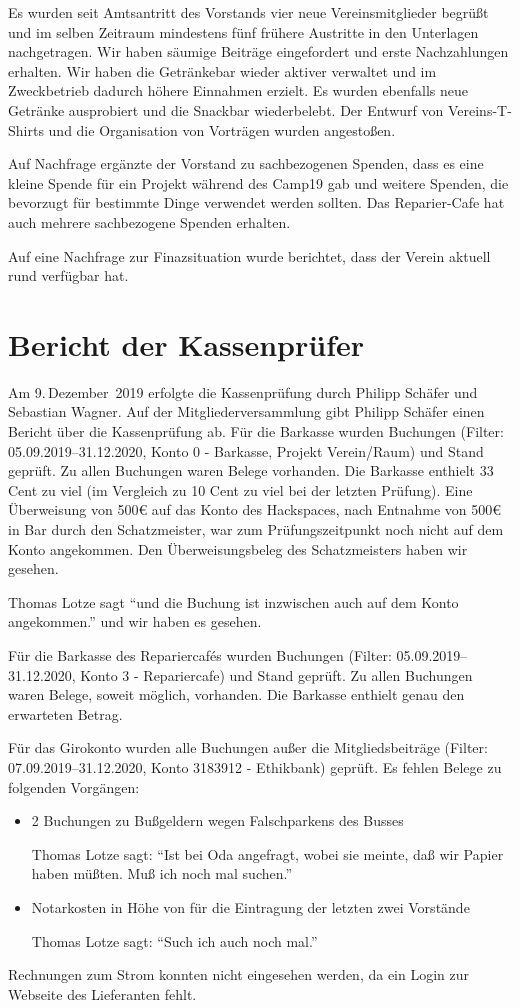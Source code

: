 \documentclass[DIV=calc,parksip=half*]{scrartcl}
\newcommand{\fiveop}{Philipp Schäfer}
\newcommand{\thomas}{Thomas Lotze}
\newcommand{\ckv}{Sebastian Wagner}
\begin{document}
Es wurden seit Amtsantritt des Vorstands vier neue Vereinsmitglieder begrüßt und im selben Zeitraum mindestens fünf frühere Austritte in den Unterlagen nachgetragen. Wir haben säumige Beiträge eingefordert und erste Nachzahlungen erhalten.
Wir haben die Getränkebar wieder aktiver verwaltet und im Zweckbetrieb dadurch höhere Einnahmen erzielt. Es wurden ebenfalls neue Getränke ausprobiert und die Snackbar wiederbelebt.
Der Entwurf von Vereins-T-Shirts und die Organisation von Vorträgen wurden angestoßen.

Auf Nachfrage ergänzte der Vorstand zu sachbezogenen Spenden, dass es eine kleine Spende für ein Projekt während des Camp19 gab und weitere Spenden, die bevorzugt für bestimmte Dinge verwendet werden sollten.
Das Reparier-Cafe hat auch mehrere sachbezogene Spenden erhalten.

Auf eine Nachfrage zur Finazsituation wurde berichtet, dass der Verein aktuell rund  verfügbar hat.
\section{Bericht der Kassenprüfer}
Am 9.\,Dezember~2019 erfolgte die Kassenprüfung durch \fiveop{} und  \ckv. Auf der
Mitgliederversammlung gibt \fiveop{} einen Bericht über die Kassenprüfung ab. Für die Barkasse wurden Buchungen (Filter: 05.09.2019--31.12.2020, Konto 0 - Barkasse, Projekt Verein/Raum) und Stand geprüft. Zu allen Buchungen waren Belege vorhanden. Die Barkasse enthielt 33 Cent zu viel (im Vergleich zu 10 Cent
zu viel bei der letzten Prüfung). Eine Überweisung von 500€ auf das Konto des Hackspaces, nach Entnahme von 500€ in Bar durch den Schatzmeister, war zum Prüfungszeitpunkt noch nicht auf dem Konto angekommen. Den Überweisungsbeleg des Schatzmeisters haben wir gesehen.

\thomas{} sagt \enquote{und die Buchung ist inzwischen auch auf dem Konto angekommen.} und wir haben es gesehen.

Für die Barkasse des Repariercafés wurden Buchungen (Filter:
05.09.2019--31.12.2020, Konto 3 - Repariercafe) und Stand geprüft.
Zu allen Buchungen waren Belege, soweit möglich, vorhanden. Die Barkasse enthielt genau den erwarteten Betrag.


Für das Girokonto wurden alle Buchungen außer die Mitgliedsbeiträge (Filter:
07.09.2019--31.12.2020, Konto 3183912 - Ethikbank) geprüft. Es fehlen Belege zu
folgenden Vorgängen:
\begin{itemize}
 \item 2 Buchungen zu Bußgeldern wegen Falschparkens des Busses
 
 \thomas{} sagt: \enquote{Ist bei Oda angefragt, wobei sie meinte, daß wir Papier haben müßten. Muß ich noch mal suchen.}
 
 \item Notarkosten in Höhe von  für die Eintragung der letzten zwei Vorstände

\thomas{} sagt: \enquote{Such ich auch noch mal.}
\end{itemize}
Rechnungen zum Strom konnten nicht eingesehen werden, da ein Login zur Webseite des Lieferanten fehlt.
\end{document}
